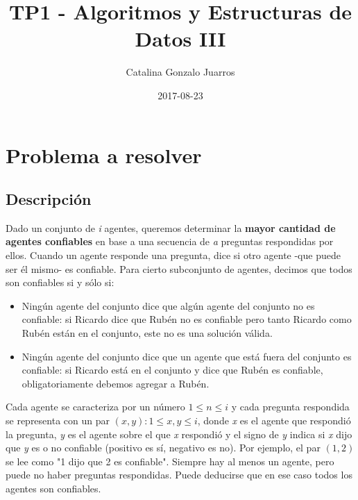 \documentclass[10pt, a4paper]{article}
\title{TP1 - Algoritmos y Estructuras de Datos III}
\date{2017-08-23}
\author{Catalina Gonzalo Juarros}
\begin{document}

\maketitle

\newpage

\tableofcontents

\newpage


\section{Problema a resolver}

	\subsection{Descripci\'on}

		Dado un conjunto de \textit{i} agentes, queremos determinar la \textbf{mayor cantidad de agentes confiables} en base a una secuencia de \textit{a} preguntas respondidas por ellos. Cuando un agente responde una pregunta, dice si otro agente -que puede ser \'el mismo- es confiable. Para cierto subconjunto de agentes, decimos que todos son confiables si y s\'olo si:
	
		\begin{itemize}
		\item Ning\'un agente del conjunto dice que alg\'un agente del conjunto no es confiable: si Ricardo dice que Rub\'en no es confiable pero tanto Ricardo como Rub\'en est\'an en el conjunto, este no es una soluci\'on v\'alida.
		\item Ning\'un agente del conjunto dice que un agente que est\'a fuera del conjunto es confiable: si Ricardo est\'a en el conjunto y dice que Rub\'en es confiable, obligatoriamente debemos agregar a Rub\'en.
		\end{itemize}
		
		Cada agente se caracteriza por un n\'umero $1 \leq n \leq i$ y cada pregunta respondida se representa con un par $(x,y): 1 \leq x,y \leq i$, donde \textit{x} es el agente que respondi\'o la pregunta, \textit{y} es el agente sobre el que \textit{x} respondi\'o y el signo de \textit{y} indica si \textit{x} dijo que \textit{y} es o no confiable (positivo es s\'i, negativo es no). Por ejemplo, el par $(1,2)$ se lee como "1 dijo que 2 es confiable". Siempre hay al menos un agente, pero puede no haber preguntas respondidas. Puede deducirse que en ese caso todos los agentes son confiables.
		
\end{document}
